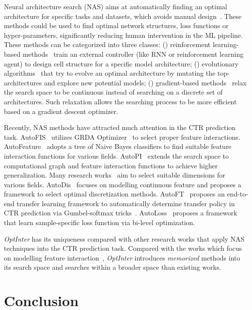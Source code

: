 \documentclass[conference]{IEEEtran}
\begin{document}
Neural architecture search (NAS) aims at automatically finding an optimal architecture for specific tasks and datasets, which avoids manual design~\cite{MetaQNN,NAS,DARTS,NAO,Large-Scale-Evolution,Regularized-Evolution}. These methods could be used to find optimal network structures, loss functions or hyper-parameters, significantly reducing human intervention in the ML pipeline. These methods can be categorized into three classes: () reinforcement learning-based methods~\cite{MetaQNN,NAS} train an external controller (like RNN or reinforcement learning agent) to design cell structure for a specific model architecture; () evolutionary algorithms~\cite{Large-Scale-Evolution,Regularized-Evolution} that try to evolve an optimal architecture by mutating the top- architectures and explore new potential models; () gradient-based methods~\cite{NAO,DARTS} relax the search space to be continuous instead of searching on a discrete set of architectures. Such relaxation allows the searching process to be more efficient based on a gradient descent optimizer.

Recently, NAS methods have attracted much attention in the CTR prediction task. AutoFIS~\cite{AutoFis} utilizes GRDA Optimizer~\cite{GRDA} to select proper feature interactions. AutoFeature~\cite{AutoFeature} adopts a tree of Naive Bayes classifiers to find suitable feature interaction functions for various fields. AutoPI~\cite{AutoPI} extends the search space to computational graph and feature interaction functions to achieve higher generalization. Many research works~\cite{AutoDim,AutoEmb,ESAPN} aim to select suitable dimensions for various fields. AutoDis~\cite{AutoDis} focuses on modelling continuous feature and proposes a framework to select optimal discretization methods. AutoFT~\cite{AutoFT} proposes an end-to-end transfer learning framework to automatically determine transfer policy in CTR prediction via Gumbel-softmax tricks~\cite{Gumbel-Softmax}. AutoLoss~\cite{AutoLoss} proposes a framework that learn sample-specific loss function via bi-level optimization. 

\textit{OptInter} has its uniqueness compared with other research works that apply NAS techniques into the CTR prediction task. 
Compared with the works which focus on modelling feature interaction~\cite{AutoFis,AutoFeature,AutoPI}, \textit{OptInter} introduces \emph{memorized} methods into its search space and searches within a broader space than existing works. 

 \section{Conclusion}
\end{document}
